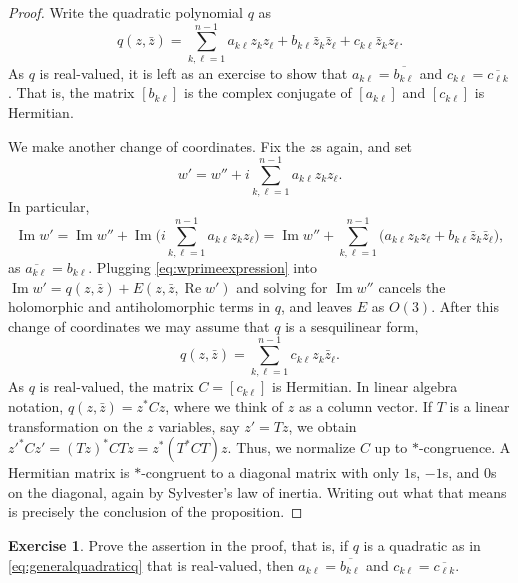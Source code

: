 \documentclass[12pt,openany]{book}
\renewcommand{\Re}{\operatorname{Re}}
\renewcommand{\Im}{\operatorname{Im}}
\theoremstyle{plain}
\theoremstyle{remark}
\theoremstyle{definition}
\newenvironment{exbox}{%
    \def\FrameCommand{\vrule width 1pt \relax\hspace{10pt}}%
    \MakeFramed{\advance\hsize-\width\FrameRestore}%
}{%
    \endMakeFramed
}
\theoremstyle{exercise}
\newtheorem{exercise}{Exercise}[section]
\theoremstyle{example}
\begin{document}
\begin{proof}
Write the quadratic polynomial $q$ as
\begin{equation} \label{eq:generalquadraticq}
q(z,\bar{z}) =
\sum_{k,\ell=1}^{n-1}
a_{k\ell} z_kz_\ell
+
b_{k\ell} \bar{z}_k\bar{z}_\ell
+
c_{k\ell} \bar{z}_kz_\ell .
\end{equation}
As $q$ is real-valued, it is left as an exercise to show that $a_{k\ell} =
\overline{b_{k\ell}}$ and $c_{k\ell} = \overline{c_{\ell k}}$.  That is, the
matrix $[b_{k\ell}]$ is the complex conjugate of $[a_{k\ell}]$ and
$[c_{k\ell}]$ is Hermitian.

We make another change of coordinates.  Fix the $z$s again, and set
\begin{equation} \label{eq:wprimeexpression}
w' = w'' + i
\sum_{k,\ell=1}^{n-1}
a_{k\ell} z_kz_\ell .
\end{equation}
In particular,
\begin{equation*}
\Im w'
= \Im w''
+ \Im \biggl(
i
\sum_{k,\ell=1}^{n-1}
a_{k\ell} z_kz_\ell
\biggr)
=
\Im w''
+
\sum_{k,\ell=1}^{n-1}
\bigl(
a_{k\ell} z_kz_\ell
+
b_{k\ell} \bar{z}_k\bar{z}_\ell
\bigr) ,
\end{equation*}
as $\overline{a_{k\ell}} = b_{k\ell}$.  Plugging
\eqref{eq:wprimeexpression} into $\Im w' = q(z,\bar{z}) + E(z,\bar{z},\Re w')$
and solving for $\Im w''$ cancels the
holomorphic and antiholomorphic terms in $q$, and leaves $E$ as $O(3)$.
After this change of coordinates we may assume
that $q$ is a sesquilinear form,
\begin{equation*}
q(z,\bar{z}) = \sum_{k,\ell=1}^{n-1} c_{k\ell} z_k \bar{z}_\ell .
\end{equation*}
As $q$ is real-valued, the matrix
$C = [ c_{k\ell} ]$ is Hermitian.  In linear algebra notation,
$q(z,\bar{z}) = z^*Cz$,
where we think of $z$ as a column vector.
If $T$ is a linear transformation on the $z$ variables, say $z'=Tz$, we
obtain ${z'}^*Cz' = {(Tz)}^*CTz = z^* ( T^*CT) z$.  Thus, we normalize $C$
up to $*$-congruence.  A Hermitian matrix
is $*$-congruent to a diagonal matrix with only $1$s, $-1$s, and $0$s on the
diagonal, again by Sylvester's law of inertia.  Writing out what that means is precisely the conclusion of the
proposition.
\end{proof}

\begin{exbox}
\begin{exercise}
Prove the assertion in the proof, that is, if $q$ is a quadratic as in
\eqref{eq:generalquadraticq} that is real-valued, then
 $a_{k\ell} = \overline{b_{k\ell}}$ and $c_{k\ell} = \overline{c_{\ell k}}$.
\end{exercise}
\end{exbox}
\end{document}
